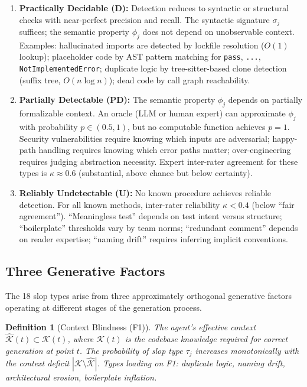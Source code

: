 \documentclass[11pt, a4paper, copyright]{googledeepmind}
\newtheorem{definition}{Definition}[section]
\begin{document}
\begin{enumerate}
    \item \textbf{Practically Decidable (D):} Detection reduces to syntactic or structural checks with near-perfect precision and recall. The syntactic signature $\sigma_j$ suffices; the semantic property $\phi_j$ does not depend on unobservable context. Examples: hallucinated imports are detected by lockfile resolution ($O(1)$ lookup); placeholder code by AST pattern matching for \texttt{pass}, \texttt{...}, \texttt{NotImplementedError}; duplicate logic by tree-sitter-based clone detection (suffix tree, $O(n \log n)$); dead code by call graph reachability.

    \item \textbf{Partially Detectable (PD):} The semantic property $\phi_j$ depends on partially formalizable context. An oracle (LLM or human expert) can approximate $\phi_j$ with probability $p \in (0.5, 1)$, but no computable function achieves $p = 1$. Security vulnerabilities require knowing which inputs are adversarial; happy-path handling requires knowing which error paths matter; over-engineering requires judging abstraction necessity. Expert inter-rater agreement for these types is $\kappa \approx 0.6$ (substantial, above chance but below certainty).

    \item \textbf{Reliably Undetectable (U):} No known procedure achieves reliable detection. For all known methods, inter-rater reliability $\kappa < 0.4$ (below ``fair agreement''). ``Meaningless test'' depends on test intent versus structure; ``boilerplate'' thresholds vary by team norms; ``redundant comment'' depends on reader expertise; ``naming drift'' requires inferring implicit conventions.
\end{enumerate}

\subsection{Three Generative Factors}

The 18 slop types arise from three approximately orthogonal generative factors operating at different stages of the generation process.

\begin{definition}[Context Blindness (F1)]
\label{def:f1}
The agent's effective context $\hat{\mathcal{K}}(t) \subset \mathcal{K}(t)$, where $\mathcal{K}(t)$ is the codebase knowledge required for correct generation at point $t$. The probability of slop type $\tau_j$ increases monotonically with the context deficit $|\mathcal{K} \setminus \hat{\mathcal{K}}|$. Types loading on F1: duplicate logic, naming drift, architectural erosion, boilerplate inflation.
\end{definition}
\end{document}
